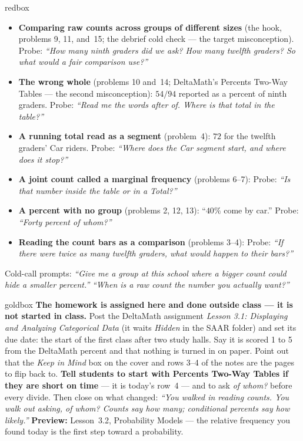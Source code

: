 \documentclass[10pt]{article}
\begin{document}
\boxguard
\begin{skillbox}{redbox}
\begin{itemize}[leftmargin=1.2em, nosep]
  \item \textbf{Comparing raw counts across groups of different sizes} (the hook, problems 9, 11,
        and~15; the debrief cold check --- the target misconception). Probe: \emph{``How many
        ninth graders did we ask? How many twelfth graders? So what would a fair comparison use?''}
  \item \textbf{The wrong whole} (problems 10 and~14; DeltaMath's Percents Two-Way Tables --- the
        second misconception):
        $54/94$ reported as a percent of ninth graders. Probe: \emph{``Read me the words after
        \emph{of}. Where is that total in the table?''}
  \item \textbf{A running total read as a segment} (problem~4): $72$ for the twelfth graders' Car
        riders. Probe: \emph{``Where does the Car segment start, and where does it stop?''}
  \item \textbf{A joint count called a marginal frequency} (problems 6--7): Probe: \emph{``Is that
        number inside the table or in a Total?''}
  \item \textbf{A percent with no group} (problems 2, 12, 13): ``$40\%$ come by car.''
        Probe: \emph{``Forty percent of whom?''}
  \item \textbf{Reading the count bars as a comparison} (problems 3--4): Probe: \emph{``If there
        were twice as many twelfth graders, what would happen to their bars?''}
\end{itemize}
Cold-call prompts: \emph{``Give me a group at this school where a bigger count could hide a
smaller percent.''} \quad \emph{``When is a raw count the number you actually want?''}
\end{skillbox}

\boxguard
\begin{skillbox}{goldbox}
\textbf{The homework is assigned here and done outside class --- it is not started in class.}
Post the DeltaMath assignment \emph{Lesson 3.1: Displaying and Analyzing Categorical Data} (it
waits \emph{Hidden} in the SAAR folder) and set its due date: the start of the first class after
two study halls. Say it is scored 1 to 5 from the DeltaMath percent and that nothing is turned in
on paper. Point out that the \emph{Keep in Mind} box on the cover and rows 3--4 of the notes are
the pages to flip back to. \textbf{Tell students to start with Percents Two-Way Tables if they
are short on time} --- it is today's row~4 --- and to ask \emph{of whom?} before every divide.
Then close on what changed: \emph{``You walked in
reading counts. You walk out asking, of whom? Counts say how many; conditional percents say how
likely.''} \textbf{Preview:} Lesson~3.2, Probability Models --- the relative frequency you found
today is the first step toward a probability.
\end{skillbox}
\end{document}
